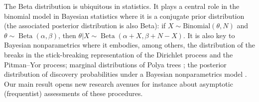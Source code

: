\documentclass[15pt]{article}
\DeclareMathOperator{\Beta}{Beta}
\theoremstyle{plain}
\begin{document}
The Beta distribution is ubiquitous in statistics. It plays a central role in the binomial model in Bayesian statistics where it is a conjugate prior distribution (the associated posterior distribution is also Beta): if $X\sim\text{Binomial}(\theta,N)$ and $\theta\sim\Beta(\alpha,\beta)$, then $\theta|X\sim\Beta(\alpha+X, \beta+N-X)$. It is also key to Bayesian nonparametrics where it embodies, among others, the distribution of the breaks in the stick-breaking representation of the Dirichlet process and the Pitman--Yor process; marginal distributions of Polya trees \citep{castillo2016polya}; 
the posterior distribution of discovery probabilities under a Bayesian nonparametrics model \citep{arbel2015discovery}. Our main result opens new research avenues for instance about asymptotic (frequentist)  assessments of these procedures.\bigskip
\end{document}

